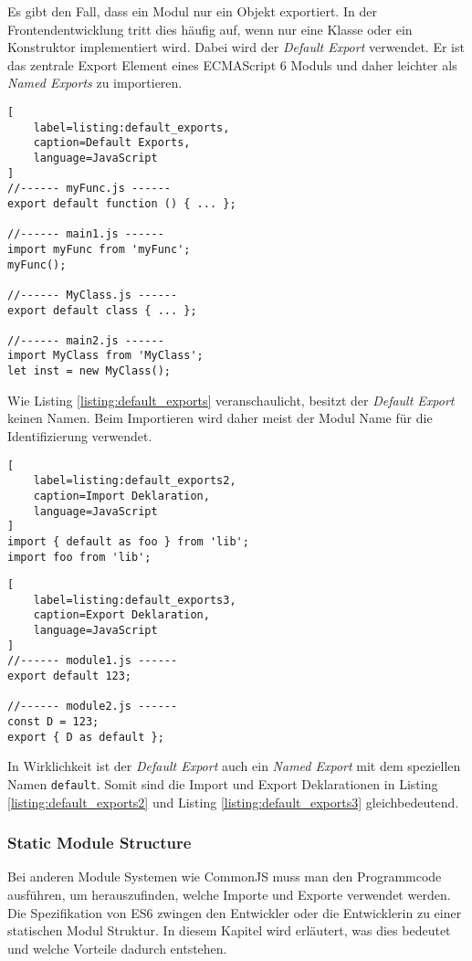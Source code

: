 Es gibt den Fall, dass ein Modul nur ein Objekt exportiert. In der Frontendentwicklung tritt dies häufig auf, wenn nur eine Klasse oder ein Konstruktor implementiert wird. Dabei wird der \textit{Default Export} verwendet. Er ist das zentrale Export Element eines ECMAScript 6 Moduls und daher leichter als \textit{Named Exports} zu importieren. \autocite{Rauschmayer2014}

\begin{lstlisting}[
    label=listing:default_exports,
	caption=Default Exports,
	language=JavaScript
]
//------ myFunc.js ------
export default function () { ... };

//------ main1.js ------
import myFunc from 'myFunc';
myFunc();

//------ MyClass.js ------
export default class { ... };

//------ main2.js ------
import MyClass from 'MyClass';
let inst = new MyClass();
\end{lstlisting}

Wie Listing \ref{listing:default_exports} veranschaulicht, besitzt der \textit{Default Export} keinen Namen. Beim Importieren wird daher meist der Modul Name für die Identifizierung verwendet.

 \begin{lstlisting}[
    label=listing:default_exports2,
    caption=Import Deklaration,
	language=JavaScript
]
import { default as foo } from 'lib';
import foo from 'lib';
\end{lstlisting}

\begin{lstlisting}[
    label=listing:default_exports3,
    caption=Export Deklaration,
	language=JavaScript
]
//------ module1.js ------
export default 123;

//------ module2.js ------
const D = 123;
export { D as default };
\end{lstlisting}

In Wirklichkeit ist der \textit{Default Export} auch ein \textit{Named Export} mit dem speziellen Namen \lstinline{default}. Somit sind die Import  und Export Deklarationen in Listing \ref{listing:default_exports2} und Listing \ref{listing:default_exports3} gleichbedeutend. \autocite{Rauschmayer2014}

\subsubsection{Static Module Structure}
Bei anderen Module Systemen wie CommonJS muss man den Programmcode ausführen, um herauszufinden, welche Importe und Exporte verwendet werden. Die Spezifikation von ES6 zwingen den Entwickler oder die Entwicklerin zu einer statischen Modul Struktur. In diesem Kapitel wird erläutert, was dies bedeutet und welche Vorteile dadurch entstehen.
\autocite{Rauschmayer2014}

